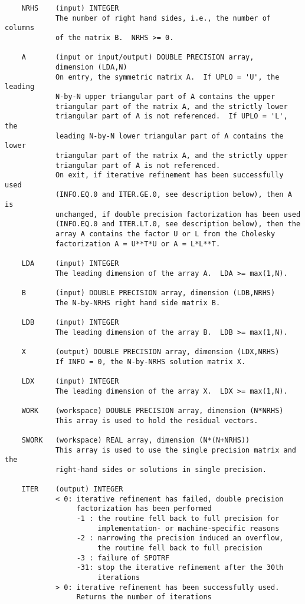 \documentclass[10pt]{book}
\begin{document}
\begin{verbatim}
    NRHS    (input) INTEGER
            The number of right hand sides, i.e., the number of columns
            of the matrix B.  NRHS >= 0.

    A       (input or input/output) DOUBLE PRECISION array,
            dimension (LDA,N)
            On entry, the symmetric matrix A.  If UPLO = 'U', the leading
            N-by-N upper triangular part of A contains the upper
            triangular part of the matrix A, and the strictly lower
            triangular part of A is not referenced.  If UPLO = 'L', the
            leading N-by-N lower triangular part of A contains the lower
            triangular part of the matrix A, and the strictly upper
            triangular part of A is not referenced.
            On exit, if iterative refinement has been successfully used
            (INFO.EQ.0 and ITER.GE.0, see description below), then A is
            unchanged, if double precision factorization has been used
            (INFO.EQ.0 and ITER.LT.0, see description below), then the
            array A contains the factor U or L from the Cholesky
            factorization A = U**T*U or A = L*L**T.

    LDA     (input) INTEGER
            The leading dimension of the array A.  LDA >= max(1,N).

    B       (input) DOUBLE PRECISION array, dimension (LDB,NRHS)
            The N-by-NRHS right hand side matrix B.

    LDB     (input) INTEGER
            The leading dimension of the array B.  LDB >= max(1,N).

    X       (output) DOUBLE PRECISION array, dimension (LDX,NRHS)
            If INFO = 0, the N-by-NRHS solution matrix X.

    LDX     (input) INTEGER
            The leading dimension of the array X.  LDX >= max(1,N).

    WORK    (workspace) DOUBLE PRECISION array, dimension (N*NRHS)
            This array is used to hold the residual vectors.

    SWORK   (workspace) REAL array, dimension (N*(N+NRHS))
            This array is used to use the single precision matrix and the
            right-hand sides or solutions in single precision.

    ITER    (output) INTEGER
            < 0: iterative refinement has failed, double precision
                 factorization has been performed
                 -1 : the routine fell back to full precision for
                      implementation- or machine-specific reasons
                 -2 : narrowing the precision induced an overflow,
                      the routine fell back to full precision
                 -3 : failure of SPOTRF
                 -31: stop the iterative refinement after the 30th
                      iterations
            > 0: iterative refinement has been successfully used.
                 Returns the number of iterations


\end{verbatim}
\end{document}
